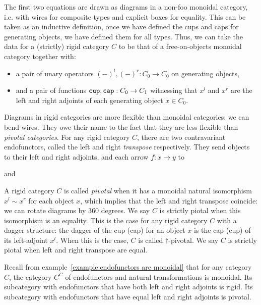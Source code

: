 The first two equations are drawn as diagrams in a non-foo monoidal category, i.e. with wires for composite types and explicit boxes for equality.
This can be taken as an inductive definition, once we have defined the cups and caps for generating objects, we have defined them for all types.
Thus, we can take the data for a (strictly) rigid category $C$ to be that of a free-on-objects monoidal category together with:
\begin{itemize}
    \item a pair of unary operators $(-)^l, (-)^r : C_0 \to C_0$ on generating objects,
    \item and a pair of functions $\mathtt{cup}, \mathtt{cap} : C_0 \to C_1$ witnessing that $x^l$ and $x^r$ are the left and right adjoints of each generating object $x \in C_0$.
\end{itemize}
Diagrams in rigid categories are more flexible than monoidal categories: we can bend wires.
They owe their name to the fact that they are less flexible than \emph{pivotal categories}.
For any rigid category $C$, there are two contravariant endofunctors, called the left and right \emph{transpose} respectively.
They send objects to their left and right adjoints, and each arrow $f : x \to y$ to
\begin{center}
\hspace{50pt} and \hspace{50pt}
\end{center}
A rigid category $C$ is called \emph{pivotal} when it has a monoidal natural isomorphism $x^l \sim x^r$ for each object $x$, which implies that the left and right transpose coincide: we can rotate diagrams by 360 degrees.
We say $C$ is strictly piotal when this isomorphism is an equality.
This is the case for any rigid category $C$ with a dagger structure: the dagger of the cup (cap) for an object $x$ is the cap (cup) of its left-adjoint $x^l$.
When this is the case, $C$ is called $\dagger$-pivotal.
We say $C$ is strictly piotal when left and right transpose are equal.

\begin{example}
Recall from example~\ref{example:endofunctors are monoidal} that for any category $C$, the category $C^C$ of endofunctors and natural transformations is monoidal.
Its subcategory with endofunctors that have both left and right adjoints is rigid.
Its subcategory with endofunctors that have equal left and right adjoints is pivotal.
\end{example}

